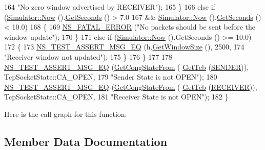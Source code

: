 \begin{DoxyCode}
164                                  \textcolor{stringliteral}{"No zero window advertised by RECEIVER"});
165         \}
166       \textcolor{keywordflow}{else} \textcolor{keywordflow}{if} (\hyperlink{group__simulator_gac3635e2e87f7ce316c89290ee1b01d0d}{Simulator::Now} ().\hyperlink{classns3_1_1Time_a8f20d5c3b0902d7b4320982f340b57c8}{GetSeconds} () > 7.0
167                && \hyperlink{group__simulator_gac3635e2e87f7ce316c89290ee1b01d0d}{Simulator::Now} ().\hyperlink{classns3_1_1Time_a8f20d5c3b0902d7b4320982f340b57c8}{GetSeconds} () < 10.0)
168         \{
169           \hyperlink{group__fatal_ga5131d5e3f75d7d4cbfd706ac456fdc85}{NS\_FATAL\_ERROR} (\textcolor{stringliteral}{"No packets should be sent before the window update"});
170         \}
171       \textcolor{keywordflow}{else} \textcolor{keywordflow}{if} (\hyperlink{group__simulator_gac3635e2e87f7ce316c89290ee1b01d0d}{Simulator::Now} ().GetSeconds () >= 10.0)
172         \{
173           \hyperlink{group__testing_ga2a9d78cffb3db8e867c35fff0b698cf5}{NS\_TEST\_ASSERT\_MSG\_EQ} (h.\hyperlink{classns3_1_1TcpHeader_aa6adcd54e5b13941acdf6328cecc9b29}{GetWindowSize} (), 2500,
174                                  \textcolor{stringliteral}{"Receiver window not updated"});
175         \}
176     \}
177 
178   \hyperlink{group__testing_ga2a9d78cffb3db8e867c35fff0b698cf5}{NS\_TEST\_ASSERT\_MSG\_EQ} (\hyperlink{group__internet-test_ga754ba534fba0aeb1e923326d7c49a7d3}{GetCongStateFrom} (
      \hyperlink{classns3_1_1TcpGeneralTest_a41500a9bdc54361db731c0538bd822fd}{GetTcb} (\hyperlink{classns3_1_1TcpGeneralTest_a29338e6b7137cad650c2ff835713f6eea5400e3d6b26928cf9e67ebb026462256}{SENDER})), TcpSocketState::CA\_OPEN,
179                          \textcolor{stringliteral}{"Sender State is not OPEN"});
180   \hyperlink{group__testing_ga2a9d78cffb3db8e867c35fff0b698cf5}{NS\_TEST\_ASSERT\_MSG\_EQ} (\hyperlink{group__internet-test_ga754ba534fba0aeb1e923326d7c49a7d3}{GetCongStateFrom} (
      \hyperlink{classns3_1_1TcpGeneralTest_a41500a9bdc54361db731c0538bd822fd}{GetTcb} (\hyperlink{classns3_1_1TcpGeneralTest_a29338e6b7137cad650c2ff835713f6eea2a9a39a8fe1edd25b643a48956b8ecff}{RECEIVER})), TcpSocketState::CA\_OPEN,
181                          \textcolor{stringliteral}{"Receiver State is not OPEN"});
182 \}
\end{DoxyCode}


Here is the call graph for this function\+:




\subsection{Member Data Documentation}
